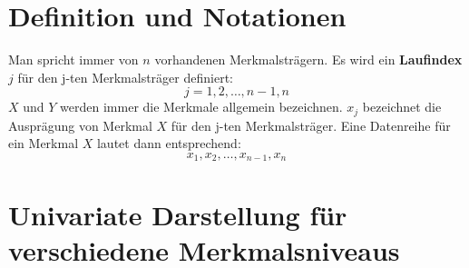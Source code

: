 \section{Definition und Notationen}
Man spricht immer von $n$ vorhandenen Merkmalsträgern. Es wird ein \textbf{Laufindex} $j$ für den j-ten Merkmalsträger definiert:
\[j=1,2,\dots,n-1,n\]
$X$ und $Y$ werden immer die Merkmale allgemein bezeichnen.
$x_j$ bezeichnet die Ausprägung von Merkmal $X$ für den j-ten Merkmalsträger.
\newline
Eine Datenreihe für ein Merkmal $X$ lautet dann entsprechend:
\[x_1, x_2, \dots, x_{n-1}, x_n\]

\section{Univariate Darstellung für verschiedene Merkmalsniveaus}
